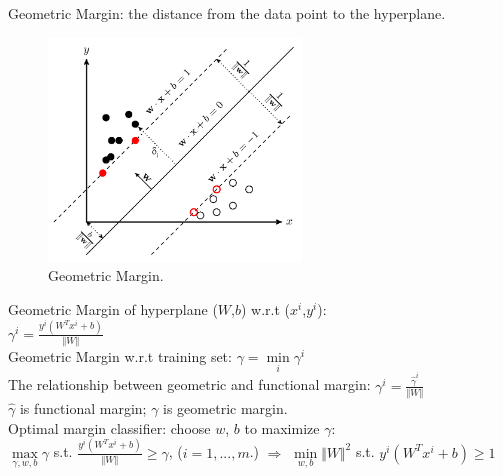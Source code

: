 \documentclass{article}
\begin{document}
\noindent
Geometric Margin: the distance from the data point to the hyperplane.
\begin{figure}[H]
	\centerline{
   \includegraphics[width=0.6\textwidth]{Fig5.png}}
   \caption{Geometric Margin.}
   \label{fig:example}
\end{figure}
Geometric Margin of hyperplane ($W$,$b$) w.r.t ($x^i$,$y^i$):\\
\indent
$\gamma^i = \frac{y^i(W^Tx^i+b)}{\Vert W \Vert}$\\
Geometric Margin w.r.t training set: $\gamma = \min\limits_{i}\gamma^i$\\
The relationship between geometric and functional margin: $\gamma^i = \frac{\hat{\gamma}^i}{\Vert W \Vert}$\\
$\hat{\gamma}$ is functional margin; $\gamma$ is geometric margin.\\

\noindent
Optimal margin classifier: choose $w$, $b$ to maximize $\gamma$:\\
\indent
$\max\limits_{\gamma,w,b}\gamma$ s.t. $\frac{y^i(W^Tx^i+b)}{\Vert W \Vert} \geq \gamma$, ($i = 1, ..., m$.) 
$\Rightarrow$ $\min\limits_{w,b} {\Vert W \Vert}^2$ s.t. $y^i(W^Tx^i+b) \geq 1 $
\end{document}
